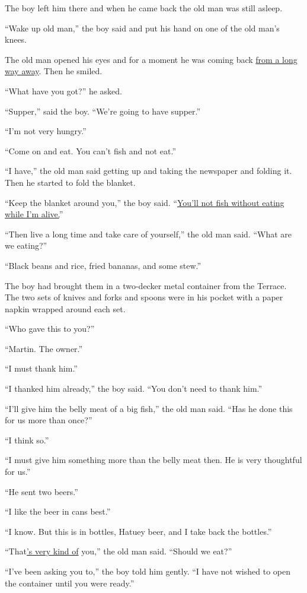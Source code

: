 \documentclass[fontset=ubuntu,zihao=-4]{ctexrep}
\begin{document}
The boy left him there and when he came back the old man was still asleep.

``Wake up old man,'' the boy said and put his hand on one of the old man's
knees.

The old man opened his eyes and for a moment he was coming back \uline{from
  a long way away}. Then he smiled.

``What have you got?'' he asked.

``Supper,'' said the boy. ``We're going to have supper.''

``I'm not very hungry.''

``Come on and eat. You can't fish and not eat.''

``I have,'' the old man said getting up and taking the newspaper and \gls{folding} it. Then he started to fold the blanket.

``Keep the blanket around you,'' the boy said. ``\uline{You'll not fish without
eating while I'm alive.}''

``Then live a long time and take care of yourself,'' the old man said. ``What are we eating?''

``Black beans and rice, \gls{fried} bananas, and some \gls{stew}.''

The boy had brought them in a two\gls{-decker} metal container from the
Terrace. The two \gls{sets} of knives and forks and \glspl{spoon} were in his pocket with
a paper \gls{napkin} wrapped around each set.

``Who gave this to you?''

``Martin. The owner.''

``I must thank him.''

``I thanked him already,'' the boy said. ``You don't need to thank him.''

``I'll give him the \gls{belly} meat of a big fish,'' the old man said. ``Has he done this for us more than once?''

``I think so.''

``I must give him something more than the belly meat then. He is very \gls{thoughtful} for us.''

``He sent two beers.''

``I like the beer in \glspl{can} best.''

``I know. But this is in bottles, Hatuey beer, and I take back the bottles.''

``That\uline{'s very kind of} you,'' the old man said. ``Should we eat?''

``I've been asking you to,'' the boy told him gently. ``I have not wished to open the container until you were ready.''
\end{document}
